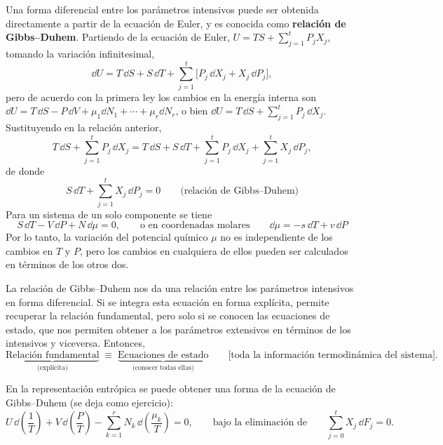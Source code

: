 Una forma diferencial entre los parámetros intensivos puede ser obtenida directamente a partir de
la ecuación de Euler, y es conocida como \textbf{relación de Gibbs--Duhem}. Partiendo de la ecuación
de Euler, $U=TS+\sum_{j=1}^{t}P_jX_j$, tomando la variación infinitesimal,
\begin{equation*}
  \dd U=T\,\dd S+S\,\dd T+\sum_{j=1}^{t}\bigl[P_j\,\dd X_j+X_j\,\dd P_j\bigr],
\end{equation*}
pero de acuerdo con la primera ley los cambios en la energía interna son
$\dd U=T\,\dd S-P\,\dd V+\mu_1\dd N_1+\cdots+\mu_r\dd N_r$, o bien $\dd U=T\,\dd S+\sum_{j=1}^{t}P_j\,\dd X_j$.
Sustituyendo en la relación anterior,
\begin{equation*}
  T\,\dd S+\sum_{j=1}^{t}P_j\,\dd X_j=T\,\dd S+S\,\dd T+\sum_{j=1}^{t}P_j\,\dd X_j+\sum_{j=1}^{t}X_j\,\dd P_j,
\end{equation*}
de donde
\begin{equation*}
  \boxed{S\,\dd T+\sum_{j=1}^{t}X_j\,\dd P_j=0}\qquad\text{(relación de Gibbs--Duhem)}
\end{equation*}
Para un sistema de un solo componente se tiene
\begin{equation*}
  S\,\dd T-V\,\dd P+N\,\dd\mu=0,
  \qquad\text{o en coordenadas molares}\qquad
  \boxed{\dd\mu=-s\,\dd T+v\,\dd P}
\end{equation*}
Por lo tanto, la variación del potencial químico $\mu$ no es independiente de los cambios en $T$ y
$P$, pero los cambios en cualquiera de ellos pueden ser calculados en términos de los otros dos.

La relación de Gibbs--Duhem nos da una relación entre los parámetros intensivos en forma
diferencial. Si se integra esta ecuación en forma explícita, permite recuperar la relación
fundamental, pero solo si se conocen las ecuaciones de estado, que nos permiten obtener a los
parámetros extensivos en términos de los intensivos y viceversa. Entonces,
\begin{equation*}
  \underbrace{\text{Relación fundamental}}_{\text{(explícita)}}\;\equiv\;\underbrace{\text{Ecuaciones de estado}}_{\text{(conocer todas ellas)}}
  \qquad\text{[toda la información termodinámica del sistema]}.
\end{equation*}

En la representación entrópica se puede obtener una forma de la ecuación de Gibbs--Duhem (se deja
como ejercicio):
\begin{equation*}
  U\,\dd\!\left(\frac{1}{T}\right)+V\,\dd\!\left(\frac{P}{T}\right)-\sum_{k=1}^{r}N_k\,\dd\!\left(\frac{\mu_k}{T}\right)=0,
  \qquad\text{bajo la eliminación de}\qquad
  \sum_{j=0}^{t}X_j\,\dd F_j=0.
\end{equation*}

